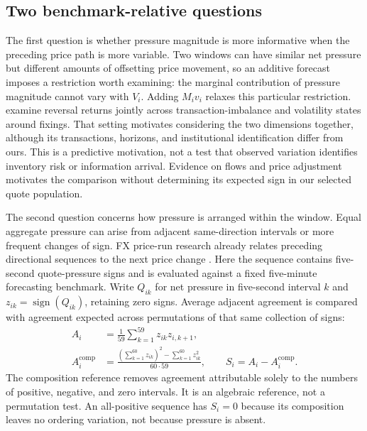 \documentclass[12pt,letterpaper]{article}
\begin{document}
\subsection{Two benchmark-relative questions}
The first question is whether pressure magnitude is more informative when the preceding price path is more variable. Two windows can have similar net pressure but different amounts of offsetting price movement, so an additive forecast imposes a restriction worth examining: the marginal contribution of pressure magnitude cannot vary with $V_i$. Adding $M_iv_i$ relaxes this particular restriction. \citet{krohn2024foreign} examine reversal returns jointly across transaction-imbalance and volatility states around fixings. That setting motivates considering the two dimensions together, although its transactions, horizons, and institutional identification differ from ours. This is a predictive motivation, not a test that observed variation identifies inventory risk or information arrival. Evidence on flows and price adjustment motivates the comparison without determining its expected sign in our selected quote population.

The second question concerns how pressure is arranged within the window. Equal aggregate pressure can arise from adjacent same-direction intervals or more frequent changes of sign. FX price-run research already relates preceding directional sequences to the next price change \citep{hashimoto2008random}. Here the sequence contains five-second quote-pressure signs and is evaluated against a fixed five-minute forecasting benchmark. Write $Q_{ik}$ for net pressure in five-second interval $k$ and $z_{ik}=\operatorname{sign}(Q_{ik})$, retaining zero signs. Average adjacent agreement is compared with agreement expected across permutations of that same collection of signs:
\begin{equation}\begin{aligned}
A_i&=\frac{1}{59}\sum_{k=1}^{59}z_{ik}z_{i,k+1},\\
A_i^{\mathrm{comp}}&=
\frac{(\sum_{k=1}^{60}z_{ik})^2-\sum_{k=1}^{60}z_{ik}^2}{60\cdot59},
\qquad S_i=A_i-A_i^{\mathrm{comp}}.
\end{aligned}\label{eq:sequence}\end{equation}
The composition reference removes agreement attributable solely to the numbers of positive, negative, and zero intervals. It is an algebraic reference, not a permutation test. An all-positive sequence has $S_i=0$ because its composition leaves no ordering variation, not because pressure is absent.
\end{document}
